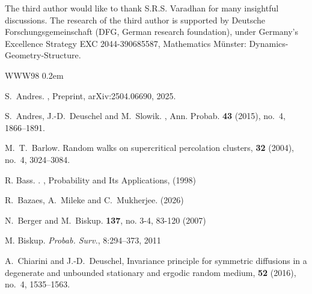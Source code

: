 \documentclass[11pt]{article}
\theoremstyle{rem}
\begin{document}
 The third author would like to thank S.R.S. Varadhan for many insightful discussions. The research of the third author
is supported by Deutsche Forschungsgemeinschaft (DFG, German research
foundation), under Germany's Excellence Strategy EXC 2044-390685587,
Mathematics M\"unster: Dynamics-Geometry-Structure.



\begin{thebibliography}{WWW98}
\itemsep0.2em 






 {\sc S.~Andres}. 
, \newblock Preprint, arXiv:2504.06690, 2025.

 {\sc S.~Andres}, {\sc J.-D.~Deuschel} and {\sc M.~Slowik.} 
, \newblock Ann. Probab. \textbf{43} (2015), no.~4, 1866--1891.


{\sc M.~T.~Barlow}. 
\newblock Random walks on supercritical percolation clusters,
 {\bf 32} (2004), no.~4, 3024--3084.

     {\sc R. Bass}.
    . 
    , Probability and Its Applications, (1998)

    {\sc R.~Bazaes}, {\sc A.~Mileke} and {\sc C.~Mukherjee.}
    (2026)
    


  
 {\sc N.~Berger} and {\sc M.~Biskup.}  
   {\bf 137}, no. 3-4, 83-120 (2007)

    {\sc M. Biskup.}  {\it Probab. Surv.},  8:294–373, 2011
  


A.~Chiarini and J.-D.~Deuschel,
\newblock Invariance principle for symmetric diffusions in a degenerate and unbounded stationary and ergodic random medium,
 \textbf{52} (2016), no.~4, 1535--1563.



\end{thebibliography}
\end{document}
